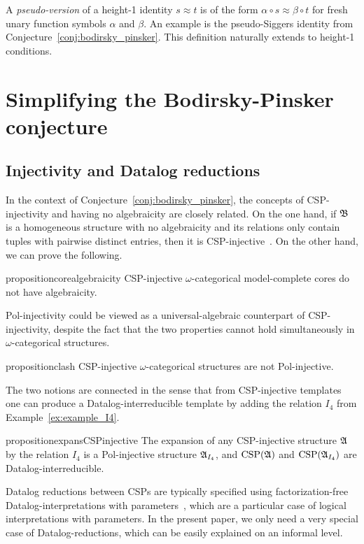 A \emph{pseudo-version} of a height-1 identity $s \approx t$ is of the form $\alpha \circ s \approx \beta \circ t$ for fresh unary function symbols $\alpha$ and $\beta$.
% 
An example is the pseudo-Siggers identity from Conjecture~\ref{conj:bodirsky_pinsker}. 
%
This definition naturally extends to height-1 conditions. 
 
\section{Simplifying the Bodirsky-Pinsker conjecture} \label{section:algebraicity_irrelevant}
 
 
\subsection{Injectivity and Datalog reductions}
 

In the context of Conjecture~\ref{conj:bodirsky_pinsker}, the concepts of CSP-injectivity and having no algebraicity are closely related.
% 
On the one hand, if $\mathfrak{B}$ is a homogeneous structure with no algebraicity and its relations only contain  tuples with pairwise distinct entries, then it is CSP-injective~\cite[Lemma~4.3.6]{bodirsky2021complexity}.
%
On the other hand, we can prove the following.

\begin{restatable}{proposition}{corealgebraicity} \label{prop:CSP_injective_no_algebraicity}
 CSP-injective $\omega$-categorical model-complete cores do not have algebraicity. 
\end{restatable}     
%  
Pol-injectivity could be viewed as a universal-algebraic counterpart of CSP-injectivity, despite the fact that the  two properties cannot hold simultaneously in $\omega$-categorical structures.

\begin{restatable}{proposition}{clash} \label{prop:pol_and_CSP_injectivity}
CSP-injective $\omega$-categorical structures are not Pol-injective.
 \end{restatable}    

 The two notions are connected in the sense that from CSP-injective templates one can produce a Datalog-interreducible template by adding the relation $I_4$ from Example~\ref{ex:example_I4}.
  
  \begin{restatable}{proposition}{expansCSPinjective} \label{prop:expans_datalog}
The expansion  of any CSP-injective structure $\mathfrak{A}$ by the relation $I_4$ is a Pol-injective  structure $\mathfrak{A}_{I_4}$, and  $\mathrm{CSP}(\mathfrak{A})$ and $\mathrm{CSP}(\mathfrak{A}_{I_4})$  are Datalog-interreducible.
 \end{restatable} 
%
Datalog reductions between CSPs are typically specified using factorization-free Datalog-interpretations with parameters~\cite{atserias2009affine,dalmau2024local}, which are a particular case of logical interpretations with parameters. 
%
In the present paper, we only need a very special case of Datalog-reductions, which can be easily explained on an informal level.


